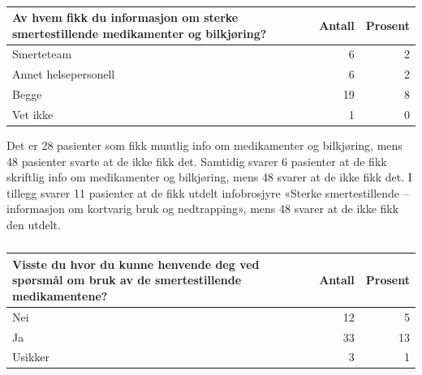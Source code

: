 \documentclass[
]{article}
\begin{document}
\begin{table}

\caption{\label{tab:opi}}
\centering
\begin{tabular}[t]{l|r|r}
\hline
Av hvem fikk du informasjon om sterke smertestillende medikamenter og bilkjøring? & Antall  & Prosent\\
\hline
Smerteteam & 6 & 2\\
\hline
Annet helsepersonell & 6 & 2\\
\hline
Begge & 19 & 8\\
\hline
Vet ikke & 1 & 0\\
\hline
\end{tabular}
\end{table}

Det er 28 pasienter som fikk muntlig info om medikamenter og bilkjøring,
mens 48 pasienter svarte at de ikke fikk det. Samtidig svarer 6
pasienter at de fikk skriftlig info om medikamenter og bilkjøring, mens
48 svarer at de ikke fikk det. I tillegg svarer 11 pasienter at de fikk
utdelt infobrosjyre «Sterke smertestillende -- informasjon om kortvarig
bruk og nedtrapping», mens 48 svarer at de ikke fikk den utdelt.

\begin{table}

\caption{\label{tab:opi}}
\centering
\begin{tabular}[t]{l|r|r}
\hline
Visste du hvor du kunne henvende deg ved spørsmål om bruk av de smertestillende medikamentene? & Antall  & Prosent\\
\hline
Nei & 12 & 5\\
\hline
Ja & 33 & 13\\
\hline
Usikker & 3 & 1\\
\hline
\end{tabular}
\end{table}
\end{document}
